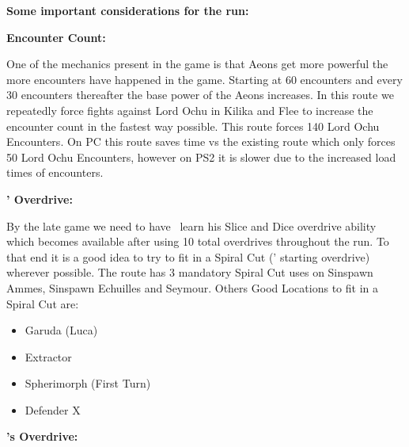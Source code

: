 \vspace{\baselineskip}

\textbf{\Large Some important considerations for the run:}

\vspace{\baselineskip}

\textbf{\large Encounter Count:}

One of the mechanics present in the game is that Aeons get more powerful the more encounters have happened in the game. Starting at 60 encounters and every 30 encounters thereafter the base power of the Aeons increases. In this route we repeatedly force fights against Lord Ochu in Kilika and Flee to increase the encounter count in the fastest way possible. This route forces 140 Lord Ochu Encounters. On PC this route saves time vs the existing route which only forces 50 Lord Ochu Encounters, however on PS2 it is slower due to the increased load times of encounters.

\vspace{\baselineskip}

\textbf{\large \tidus' Overdrive:}

\vspace{\baselineskip}

By the late game we need to have \tidus\ learn his Slice and Dice overdrive ability which becomes available after using 10 total overdrives throughout the run. To that end it is a good idea to try to fit in a Spiral Cut (\tidus' starting overdrive) wherever possible. The route has 3 mandatory Spiral Cut uses on Sinspawn Ammes, Sinspawn Echuilles and Seymour. Others Good Locations to fit in a Spiral Cut are:

\vspace{\baselineskip}

\begin{itemize}

	\item Garuda (Luca)
	\item Extractor
	\item Spherimorph (First Turn)
	\item Defender X

\end{itemize}

\vspace{\baselineskip}
	
\textbf{\large \lulu's Overdrive:}

\vspace{\baselineskip}

